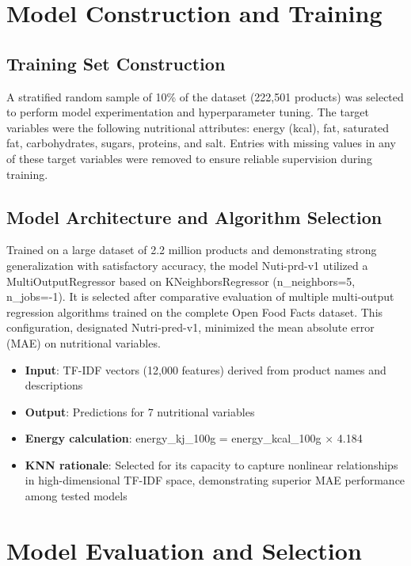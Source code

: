 \section{Model Construction and Training}

\subsection{Training Set Construction}
A stratified random sample of 10\% of the dataset (222,501 products) was selected to perform model experimentation and hyperparameter tuning. The target variables were the following nutritional attributes: energy (kcal), fat, saturated fat, carbohydrates, sugars, proteins, and salt.
Entries with missing values in any of these target variables were removed to ensure reliable supervision during training.

\subsection{Model Architecture and Algorithm Selection}
Trained on a large dataset of 2.2 million products and demonstrating strong generalization with satisfactory accuracy, the model Nuti-prd-v1 utilized a MultiOutputRegressor based on KNeighborsRegressor (n\_neighbors=5, n\_jobs=-1). It is selected after comparative evaluation of multiple multi-output regression algorithms trained on the complete Open Food Facts dataset. This configuration, designated Nutri-pred-v1, minimized the mean absolute error (MAE) on nutritional variables.

\begin{itemize}[label=-]
    \item \textbf{Input}: TF-IDF vectors (12,000 features) derived from product names and descriptions
    \item \textbf{Output}: Predictions for 7 nutritional variables
    \item \textbf{Energy calculation}: energy\_kj\_100g = energy\_kcal\_100g × 4.184
    \item \textbf{KNN rationale}: Selected for its capacity to capture nonlinear relationships in high-dimensional TF-IDF space, demonstrating superior MAE performance among tested models
\end{itemize}

\section{Model Evaluation and Selection}


